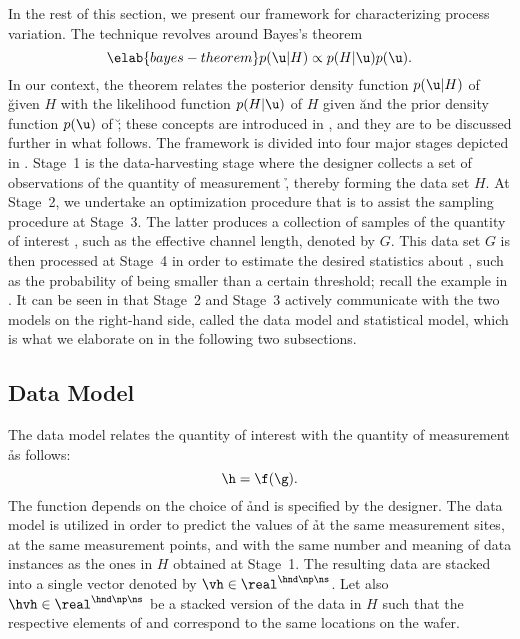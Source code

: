 In the rest of this section, we present our framework for characterizing process
variation. The technique revolves around Bayes's theorem \cite{gelman2013}
\begin{equation} \elab{bayes-theorem}
  p(\u | H) \propto p(H | \u) p(\u).
\end{equation}
In our context, the theorem relates the posterior density function $p(\u |H)$ of
\u given $H$ with the likelihood function $p(H | \u)$ of $H$ given \u and the
prior density function $p(\u)$ of \u; these concepts are introduced in
, and they are to be discussed further in what
follows. The framework is divided into four major stages depicted in
. Stage~1 is the data-harvesting stage where the designer
collects a set of observations of the quantity of measurement \h, thereby
forming the data set $H$. At Stage~2, we undertake an optimization procedure
that is to assist the sampling procedure at Stage~3. The latter produces a
collection of samples of the quantity of interest \g, such as the effective
channel length, denoted by $G$. This data set $G$ is then processed at Stage~4
in order to estimate the desired statistics about \g, such as the probability of
\g being smaller than a certain threshold; recall the example in
. It can be seen in  that Stage~2
and Stage~3 actively communicate with the two models on the right-hand side,
called the data model and statistical model, which is what we elaborate on in
the following two subsections.

\subsection{Data Model}

The data model relates the quantity of interest \g with the quantity of
measurement \h as follows:
\[
  \h = \f(\g).
\]
The function \f depends on the choice of \h and is specified by the designer.
The data model is utilized in order to predict the values of \h at the same
measurement sites, at the same measurement points, and with the same number and
meaning of data instances as the ones in $H$ obtained at Stage~1. The resulting
data are stacked into a single vector denoted by $\vh \in \real^{\hnd \np \ns}$.
Let also $\hvh \in \real^{\hnd \np \ns}$ be a stacked version of the data in $H$
such that the respective elements of \vh and \hvh correspond to the same
locations on the wafer.

